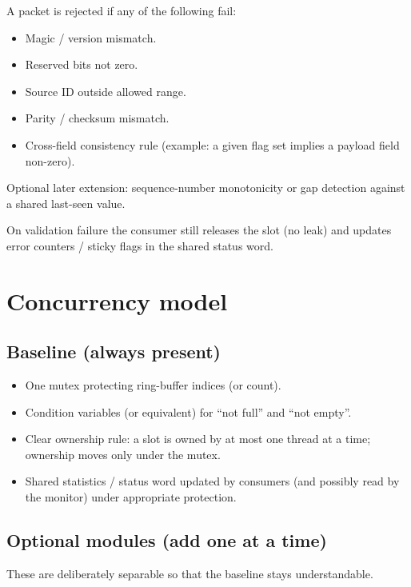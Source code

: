 \documentclass[11pt,a4paper]{article}
\begin{document}
A packet is rejected if any of the following fail:
\begin{itemize}[leftmargin=*]
    \item Magic / version mismatch.
    \item Reserved bits not zero.
    \item Source ID outside allowed range.
    \item Parity / checksum mismatch.
    \item Cross-field consistency rule (example: a given flag set implies a payload field non-zero).
\end{itemize}

Optional later extension: sequence-number monotonicity or gap detection against a shared last-seen value.

On validation failure the consumer still releases the slot (no leak) and updates error counters / sticky flags in the shared status word.

\section{Concurrency model}
\label{sec:concurrency}

\subsection{Baseline (always present)}

\begin{itemize}[leftmargin=*]
    \item One mutex protecting ring-buffer indices (or count).
    \item Condition variables (or equivalent) for ``not full'' and ``not empty''.
    \item Clear ownership rule: a slot is owned by at most one thread at a time; ownership moves only under the mutex.
    \item Shared statistics / status word updated by consumers (and possibly read by the monitor) under appropriate protection.
\end{itemize}

\subsection{Optional modules (add one at a time)}

These are deliberately separable so that the baseline stays understandable.
\end{document}

